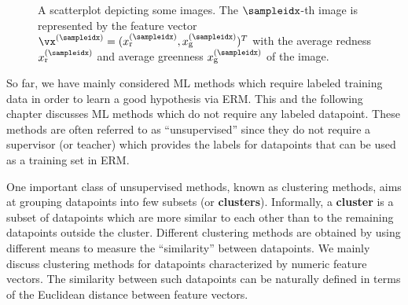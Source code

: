 \documentclass[12pt]{report}
\begin{document}
\begin{figure}[htbp]
\begin{center}
\end{center}
\caption{A scatterplot depicting some images. The $\sampleidx$-th image is 
	represented by the feature vector $\vx^{(\sampleidx)}=(x^{(\sampleidx)}_{\rm r},x^{(\sampleidx)}_{\rm g})^{T}$ 
	with the average redness $x_{\rm r}^{(\sampleidx)}$ and average greenness $x_{\rm g}^{(\sampleidx)}$ of the image. 
} 
\label{fig_scatterplot_clustering}
\end{figure}

So far, we have mainly considered ML methods which require labeled training data in order to 
learn a good hypothesis via ERM. This and the following chapter discusses ML methods which 
do not require any labeled datapoint. These methods are often referred to as ``unsupervised'' 
since they do not require a supervisor (or teacher) which provides the labels for datapoints that 
can be used as a training set in ERM. 

One important class of unsupervised methods, known as clustering methods, aims at grouping 
datapoints into few subsets (or {\bf clusters}). Informally, a {\bf cluster} is a subset of datapoints 
which are more similar to each other than to the remaining datapoints outside the cluster. Different 
clustering methods are obtained by using different means to measure the ``similarity'' between datapoints. 
We mainly discuss clustering methods for datapoints characterized by numeric feature vectors. The 
similarity between such datapoints can be naturally defined in terms of the Euclidean distance between 
feature vectors. 
\end{document}
